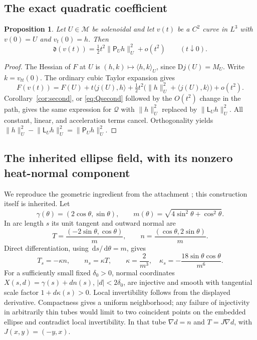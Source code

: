 \documentclass[11pt,a4paper]{article}
\newtheorem{proposition}[theorem]{Proposition}
\theoremstyle{definition}\newtheorem{definition}[theorem]{Definition}
\theoremstyle{remark}\newtheorem{remark}[theorem]{Remark}
\newcommand{\Q}{\mathcal Q}
\newcommand{\M}{\mathcal M}
\newcommand{\LP}{\mathsf L}
\newcommand{\GP}{\mathsf P}
\newcommand{\dd}{\,\mathrm d}
\newcommand{\norm}[1]{\lVert #1\rVert}
\newcommand{\ip}[2]{\langle #1,#2\rangle}
\numberwithin{equation}{section}
\begin{document}
\subsection{The exact quadratic coefficient}
\begin{proposition}\label{prop:gapquadratic}
Let $U\in\M$ be solenoidal and let $v(t)$ be a $C^2$ curve in $L^3$ with $v(0)=U$ and $v_t(0)=h$. Then
\begin{equation}\label{eq:gapquadratic}
 \mathfrak d(v(t))
 =\tfrac12t^2\norm{\GP_Uh}_U^2+o(t^2)
 \qquad(t\downarrow0).
\end{equation}
\end{proposition}
\begin{proof}
The Hessian of $F$ at $U$ is $(h,k)\mapsto\ip hk_U$, since $\mathrm Dj(U)=M_U$. Write $k=v_{tt}(0)$. The ordinary cubic Taylor expansion gives
\[
 F(v(t))=F(U)+t\ip{j(U)}h
 +\tfrac12t^2\bigl(\norm h_U^2+\ip{j(U)}k\bigr)+o(t^2).
\]
Corollary~\ref{cor:second}, or \eqref{eq:Qsecond} followed by the $O(t^2)$ change in the path, gives the same expression for $\Q$ with $\norm h_U^2$ replaced by $\norm{\LP_Uh}_U^2$. All constant, linear, and acceleration terms cancel. Orthogonality yields
$\norm h_U^2-\norm{\LP_Uh}_U^2=\norm{\GP_Uh}_U^2$.
\end{proof}

\subsection{The inherited ellipse field, with its nonzero heat-normal component}
We reproduce the geometric ingredient from the attachment \cite[Section 5]{Attachment}; this construction itself is inherited. Let
\[
 \gamma(\theta)=(2\cos\theta,\sin\theta),\qquad
 m(\theta)=\sqrt{4\sin^2\theta+\cos^2\theta}.
\]
In arc length $s$ its unit tangent and outward normal are
\[
 T=\frac{(-2\sin\theta,\cos\theta)}m,
 \qquad n=\frac{(\cos\theta,2\sin\theta)}m.
\]
Direct differentiation, using $\dd s/\dd\theta=m$, gives
\begin{equation}\label{eq:ellipsecurv}
 T_s=-\kappa n,\qquad n_s=\kappa T,
 \qquad \kappa=\frac2{m^3},\quad
 \kappa_s=-\frac{18\sin\theta\cos\theta}{m^6}.
\end{equation}
For a sufficiently small fixed $\delta_0>0$, normal coordinates
$X(s,d)=\gamma(s)+dn(s)$, $|d|<2\delta_0$, are injective and smooth with tangential scale factor $1+d\kappa(s)>0$. Local invertibility follows from the displayed derivative. Compactness gives a uniform neighborhood; any failure of injectivity in arbitrarily thin tubes would limit to two coincident points on the embedded ellipse and contradict local invertibility. In that tube $\nabla d=n$ and $T=J\nabla d$, with $J(x,y)=(-y,x)$.
\end{document}
